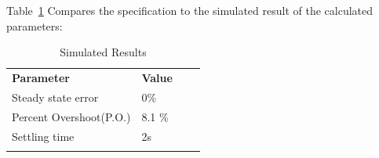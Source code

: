 Table~\ref{tbl:simspec} Compares the specification to the simulated result of the calculated parameters:

\begin{table}[h]
\centering
\caption{Simulated Results}
\label{tbl:simspec}
\begin{tabular}{llll}
\cline{1-2}
\multicolumn{1}{|l|}{\textbf{Parameter}}      & \multicolumn{1}{l|}{\textbf{Value}} &  &  \\ \cline{1-2}
\multicolumn{1}{|l|}{Steady state error}    & \multicolumn{1}{l|}{0\%}                   &  &  \\ \cline{1-2}
\multicolumn{1}{|l|}{Percent Overshoot(P.O.)} & \multicolumn{1}{l|}{8.1 \%}                       &  &  \\ \cline{1-2}
\multicolumn{1}{|l|}{Settling time} & \multicolumn{1}{l|}{2s}                       &  &  \\ \cline{1-2}
                                              &                                             &  & 
\end{tabular}

\end{table}


